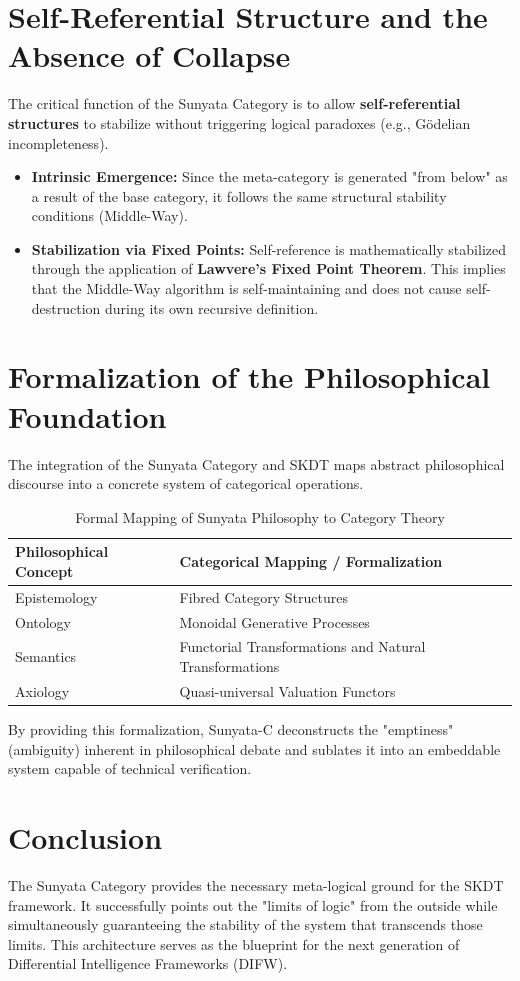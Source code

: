 \documentclass[12pt,a4paper]{article}
\begin{document}
\section{Self-Referential Structure and the Absence of Collapse}
The critical function of the Sunyata Category is to allow \textbf{self-referential structures} to stabilize without triggering logical paradoxes (e.g., G\"odelian incompleteness).
\begin{itemize}
    \item \textbf{Intrinsic Emergence:} Since the meta-category is generated "from below" as a result of the base category, it follows the same structural stability conditions (Middle-Way).
    \item \textbf{Stabilization via Fixed Points:} Self-reference is mathematically stabilized through the application of \textbf{Lawvere's Fixed Point Theorem}. This implies that the Middle-Way algorithm is self-maintaining and does not cause self-destruction during its own recursive definition.
\end{itemize}

\section{Formalization of the Philosophical Foundation}
The integration of the Sunyata Category and SKDT maps abstract philosophical discourse into a concrete system of categorical operations.

\begin{table}[h]
\centering
\begin{tabular}{|l|l|}
\hline
\textbf{Philosophical Concept} & \textbf{Categorical Mapping / Formalization} \\ \hline
Epistemology & Fibred Category Structures \\ \hline
Ontology & Monoidal Generative Processes \\ \hline
Semantics & Functorial Transformations and Natural Transformations \\ \hline
Axiology & Quasi-universal Valuation Functors \\ \hline
\end{tabular}
\caption{Formal Mapping of Sunyata Philosophy to Category Theory}
\end{table}

By providing this formalization, Sunyata-C deconstructs the "emptiness" (ambiguity) inherent in philosophical debate and sublates it into an embeddable system capable of technical verification.

\section{Conclusion}
The Sunyata Category provides the necessary meta-logical ground for the SKDT framework. It successfully points out the "limits of logic" from the outside while simultaneously guaranteeing the stability of the system that transcends those limits. This architecture serves as the blueprint for the next generation of Differential Intelligence Frameworks (DIFW).
\end{document}
